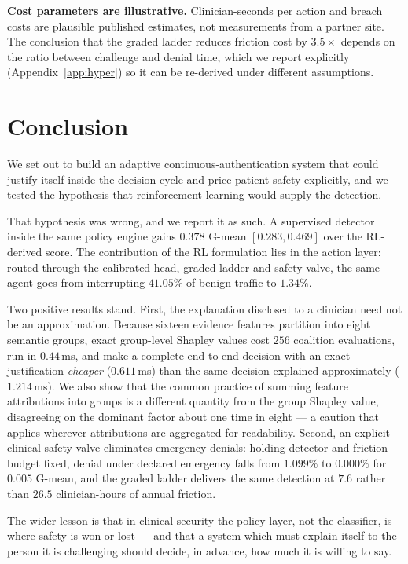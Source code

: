 \documentclass[conference]{IEEEtran}
\begin{document}
\textbf{Cost parameters are illustrative.} Clinician-seconds per action and
breach costs are plausible published estimates, not measurements from a
partner site. The conclusion that the graded ladder reduces friction cost by
$3.5\times$ depends on the ratio between challenge and denial time, which we
report explicitly (Appendix~\ref{app:hyper}) so it can be re-derived under
different assumptions.

\section{Conclusion}

We set out to build an adaptive continuous-authentication system that could
justify itself inside the decision cycle and price patient safety explicitly,
and we tested the hypothesis that reinforcement learning would supply the
detection.

That hypothesis was wrong, and we report it as such. A supervised detector
inside the same policy engine gains $0.378$ G-mean $[0.283, 0.469]$ over the
RL-derived score. The contribution of the RL formulation lies in the action
layer: routed through the calibrated head, graded ladder and safety valve, the
same agent goes from interrupting $41.05\%$ of benign traffic to $1.34\%$.

Two positive results stand. First, the explanation disclosed to a clinician
need not be an approximation. Because sixteen evidence features partition into
eight semantic groups, exact group-level Shapley values cost $256$ coalition
evaluations, run in $0.44$\,ms, and make a complete end-to-end decision with an
exact justification \emph{cheaper} ($0.611$\,ms) than the same decision
explained approximately ($1.214$\,ms). We also show that the common practice of
summing feature attributions into groups is a different quantity from the group
Shapley value, disagreeing on the dominant factor about one time in eight ---
a caution that applies wherever attributions are aggregated for readability.
Second, an explicit clinical safety valve eliminates emergency denials: holding
detector and friction budget fixed, denial under declared emergency falls from
$1.099\%$ to $0.000\%$ for $0.005$ G-mean, and the graded ladder delivers the
same detection at $7.6$ rather than $26.5$ clinician-hours of annual friction.

The wider lesson is that in clinical security the policy layer, not the
classifier, is where safety is won or lost --- and that a system which must
explain itself to the person it is challenging should decide, in advance, how
much it is willing to say.
\end{document}
